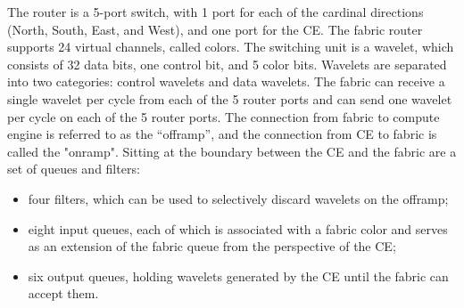 The router is a 5-port switch, with 1 port for each of the cardinal directions (North, South, East, and West), and one port for the CE.
%
The fabric router supports 24 virtual channels, called colors.
%
The switching unit is a wavelet, which consists of 32 data bits, one control bit, and 5 color bits. 
%
Wavelets are separated into two categories: control wavelets and data wavelets.
%
The fabric can receive a single wavelet per cycle from each of the 5 router ports and can send one wavelet per cycle on each of the 5 router ports.
%
The connection from fabric to compute engine is referred to as the “offramp”, and the connection from CE to fabric is called the "onramp".
%
Sitting at the boundary between the CE and the fabric are a set of queues and filters:
%
\begin{itemize}
  \item four filters, which can be used to selectively discard wavelets on the offramp;
  \item eight input queues, each of which is associated with a fabric color and serves as an extension of the fabric queue from the perspective of the CE;
  \item six output queues, holding wavelets generated by the CE until the fabric can accept them.
\end{itemize}


